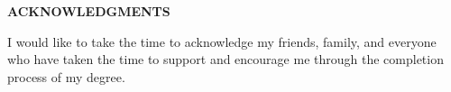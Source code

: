 \clearpage
{}
\begin{center}
 \textbf{\large ACKNOWLEDGMENTS}\\[3em]
\end{center}
\noindent I would like to take the time to acknowledge my friends, family, and everyone who have taken the time to support and encourage me through the completion process of my degree.





